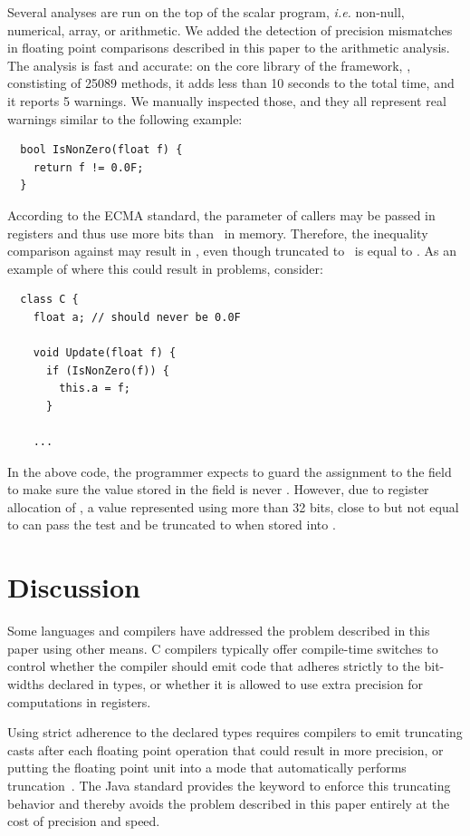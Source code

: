 \documentclass{entcs}
\newcommand{\Float}{\code{float32}\ }
\begin{document}
Several analyses are run on the top of the scalar program, \emph{i.e.}
non-null, numerical, array, or arithmetic. We added the detection of precision
mismatches in floating point
comparisons described in this paper to the arithmetic analysis.
The
analysis is fast and accurate: on the core library of the 
framework, , constisting of 25089 methods, it
adds less than 10 seconds to the total time, and it reports 5 warnings.  We manually inspected those, and they all
represent real warnings similar to the following example:
\begin{lstlisting}
  bool IsNonZero(float f) {
    return f != 0.0F;
  }
\end{lstlisting}
According to the ECMA standard, the parameter  of callers may
be passed in registers and thus use more bits than \Float in
memory. Therefore, the inequality comparison against  may result in , even
though  truncated to \Float is equal to . As an
example of where this could result in problems, consider:
\begin{lstlisting}
  class C {
    float a; // should never be 0.0F

    void Update(float f) {
      if (IsNonZero(f)) {
        this.a = f;
      }

    ...
\end{lstlisting}
In the above code, the programmer expects to guard the assignment to
the field to make sure the value stored in the field is never
. However, due to register allocation of , a value
represented using more than 32 bits, close to  but not
equal to  can pass the test and be truncated to 
when stored into .

\section{Discussion}
\label{sec:discussion}
Some languages and compilers have addressed the problem described in
this paper using other means. C compilers  typically offer
compile-time switches to control whether the compiler should emit code
that adheres strictly to the bit-widths declared in types, or whether
it is allowed to use extra precision for computations in registers.

Using strict adherence to the declared types requires compilers to
emit truncating casts after each floating point operation that could
result in more precision, or putting the floating point unit into a
mode that automatically performs truncation~\cite{Monniaux08}. 
The Java standard provides the  keyword to enforce this truncating behavior and thereby avoids the problem
described in this paper entirely at the cost of precision and speed.
\end{document}
